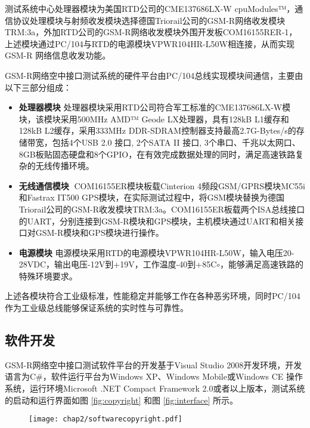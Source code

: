 测试系统中心处理器模块为美国RTD公司的CME137686LX-W cpuModules™，通信协议处理模块与射频收发模块选择德国Triorail公司的GSM-R网络收发模块TRM:3a，外加RTD公司的GSM-R网络收发模块外围开发板COM16155RER-1，上述模块通过PC/104与RTD的电源模块VPWR104HR-L50W相连接，从而实现GSM-R 网络信息收发功能。

GSM-R网络空中接口测试系统的硬件平台由PC/104总线实现模块间通信，主要由以下三部分组成：
\begin{itemize}
  \item \textbf{处理器模块}
  处理器模块采用RTD公司符合军工标准的CME137686LX-W模块，该模块采用500MHz AMD™ Geode LX处理器，具有128kB L1缓存和128kB L2缓存，采用333MHz DDR-SDRAM控制器支持最高2.7G-Bytes/s的存储带宽，包括4个USB 2.0 接口, 2个SATA II 接口, 3个串口、千兆以太网口、8GB板贴固态硬盘和8个GPIO，在有效完成数据处理的同时，满足高速铁路复杂的无线传播环境。
  \item \textbf{无线通信模块}
  COM16155ER模块板载Cinterion 4频段GSM/GPRS模块MC55i和Fastrax IT500 GPS模块，在实际测试过程中，将GSM模块替换为德国Triorail公司的GSM-R收发模块TRM:3a。COM16155ER板载两个ISA总线接口的UART，分别连接到GSM-R模块和GPS模块，主机模块通过UART和相关接口对GSM-R模块和GPS模块进行操作。
  \item\textbf{电源模块}
  电源模块采用RTD的电源模块VPWR104HR-L50W，输入电压20-28VDC，输出电压-12V到+19V，工作温度-40到+85C$\circ$，能够满足高速铁路的特殊环境要求。
\end{itemize}

上述各模块符合工业级标准，性能稳定并能够工作在各种恶劣环境，同时PC/104作为工业级总线能够保证系统的实时性与可靠性。

\subsection{软件开发}
\label{sec:softwaregsmmr}

GSM-R网络空中接口测试软件平台的开发基于Visual Studio 2008开发环境，开发语言为C\#，软件运行平台为Windows XP、Windows Mobile或Windows CE 操作系统，运行环境Microsoft .NET Compact Framework 2.0或者以上版本，测试系统的启动和运行界面如图 \ref{fig:copyright} 和图 \ref{fig:interface} 所示。

\begin{figure}[!htp]
\centering
    \texttt{[image: chap2/softwarecopyright.pdf]}
\end{figure}


